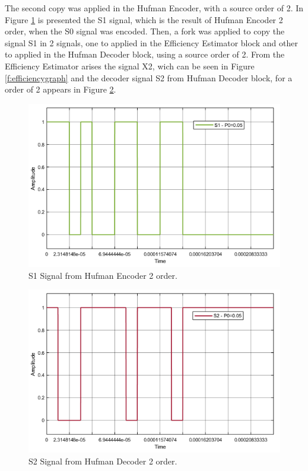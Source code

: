 \begin{refsection}
The second copy was applied in the Hufman Encoder, with a source order of 2. In Figure \ref{f:S1} is presented the S1 signal, which is the result of Hufman Encoder 2 order, when the S0 signal was encoded.
Then, a fork was applied to copy the signal S1 in 2 signals, one to applied in the Efficiency Estimator block and other to applied in the Hufman Decoder block, using a source order of 2.
From the Efficiency Estimator arises the signal X2, wich can be seen in Figure \ref{f:efficiencygraph} and the decoder signal S2 from Hufman Decoder block, for a order of 2 appears in Figure \ref{f:S2}.
\begin{figure}[!h]
\centering
\includegraphics[width=5in]{./sdf/eit_45550_estimator_source_code_efficiency/figures/S1.png}
\caption[S1 Signal from Hufman Encoder 2 order.]{S1 Signal from Hufman Encoder 2 order.}
\label{f:S1}
\end{figure}


\begin{figure}[!h]
\centering
\includegraphics[width=5in]{./sdf/eit_45550_estimator_source_code_efficiency/figures/S2.png}
\caption[S2 Signal from Hufman Decoder 2 order.]{S2 Signal from Hufman Decoder 2 order.}
\label{f:S2}
\end{figure}


\end{refsection}
